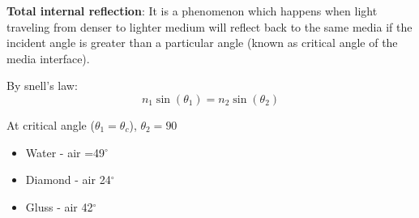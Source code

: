
\textbf{Total internal reflection}: It is a phenomenon which happens when light traveling from denser to lighter medium will reflect back to the same media if the incident angle is greater than a particular angle (known as  critical angle of the media interface).

\begin{minipage}[t][][b]{.57\textwidth}%
	By snell's law:
	$$
		n_{1} \sin \left(\theta_{1}\right)=n_{2} \sin \left(\theta_{2}\right)
	$$

	At critical angle ($\theta_1 = \theta_c$), $\theta_{2}=90$
	\vspace{-.5cm}

	\begin{itemize}
		\item Water - air =49$^{\circ}$
		\item Diamond - air 24$^{\circ}$
		\item Gluss - air 42$^{\circ}$
	\end{itemize}
\end{minipage}%
\begin{minipage}[t][][b]{.4\textwidth}%

	

	

\end{minipage}
